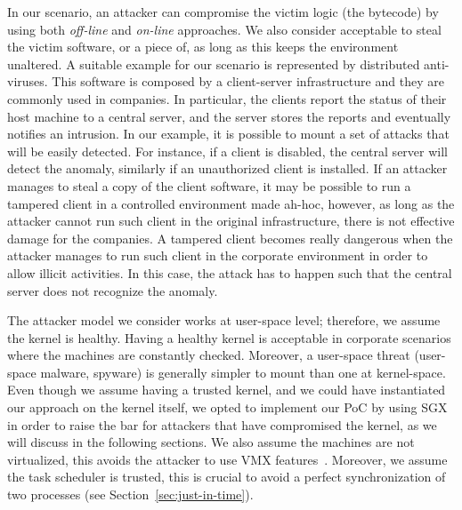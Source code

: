 In our scenario, an attacker can compromise the victim logic (\ie the bytecode) 
by using both \emph{off-line} and \emph{on-line} approaches.
We also consider acceptable to steal the victim software, or a piece of, as 
long as this keeps the environment unaltered.
A suitable example for our scenario is represented by distributed anti-viruses. 
This software is composed by a client-server infrastructure and they are 
commonly used in companies. 
In particular, the clients report the status of their host machine to a central 
server, and the server stores the reports and eventually notifies an intrusion.
In our example, it is possible to mount a set of attacks that will be easily 
detected.
For instance, if a client is disabled, the central server will detect the 
anomaly, similarly if an unauthorized client is installed.
If an attacker manages to steal a copy of the client software, it may be 
possible to run a tampered client in a controlled environment made ah-hoc, 
however, as long as the attacker cannot run such client in the original 
infrastructure, there is not effective damage for the companies.
A tampered client becomes really dangerous when the attacker manages to run 
such client in the corporate environment in order to 
allow illicit activities. In this case, the attack has to happen such that the 
central server does not recognize the anomaly.

The attacker model we consider works at user-space level; therefore, we assume 
the kernel is healthy.
Having a healthy kernel is acceptable in corporate scenarios where the machines 
are constantly checked.
Moreover, a user-space threat (\eg user-space malware, spyware) is generally 
simpler to mount than one at kernel-space.
Even though we assume having a trusted kernel, and we could have  instantiated 
our approach on the kernel itself, we opted to implement our PoC by using SGX 
in order to raise the bar for attackers that have compromised the kernel, as we 
will discuss in the following sections.
We also assume the machines are not virtualized, this avoids the attacker to 
use VMX features~\citep{uhlig2005intel}.
Moreover, we assume the task scheduler is trusted, this is crucial to avoid a 
perfect synchronization of two processes (see Section~\ref{sec:just-in-time}).

